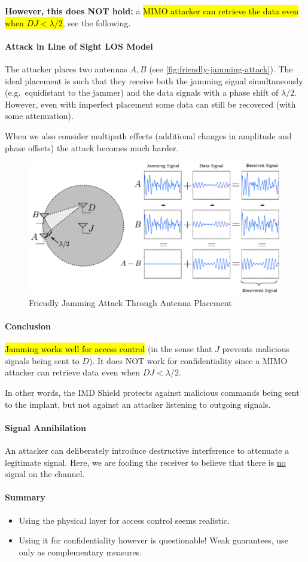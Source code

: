 \textbf{However, this does NOT hold:}
a \hl{MIMO attacker can retrieve the data even when $DJ < \lambda/2$}, see the following.

\paragraph{Attack in Line of Sight LOS Model}
The attacker places two antennas $A, B$ (see \autoref{fig:friendly-jamming-attack}).
The ideal placement is such that they receive both the jamming signal simultaneously (e.g.\ equidistant to the jammer) and the data signals with a phase shift of $\lambda/2$.
However, even with imperfect placement some data can still be recovered (with some attenuation).

When we also consider multipath effects (additional changes in amplitude and phase offsets) the attack becomes much harder.

\begin{figure}[h]
	\centering
	\includegraphics[scale=0.4]{images/7-friendly-jamming-attack.png}
	\caption{Friendly Jamming Attack Through Antenna Placement}%
	\label{fig:friendly-jamming-attack}
\end{figure}

\paragraph{Conclusion}
\hl{Jamming works well for access control} (in the sense that $J$ prevents malicious signals being sent to $D$).
It does NOT work for confidentiality since a MIMO attacker can retrieve data even when $DJ < \lambda/2$.

In other words, the IMD Shield protects against malicious commands being sent to the implant, but not against an attacker listening to outgoing signals.

\paragraph{Signal Annihilation}
An attacker can deliberately introduce destructive interference to attenuate a legitimate signal.
Here, we are fooling the receiver to believe that there is \underline{no} signal on the channel.

\paragraph{Summary}
\begin{itemize}
	\item Using the physical layer for access control seems realistic.
	\item Using it for confidentiality however is questionable!
	      Weak guarantees, use only as complementary measures.
\end{itemize}


